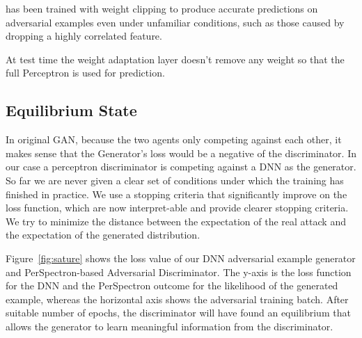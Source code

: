 \begin{note}
\scheme{} has been trained with weight clipping to produce accurate predictions on adversarial examples even under unfamiliar conditions, such as those caused by dropping a highly correlated feature.
\end{note}
 At test time the weight adaptation layer doesn't remove any weight so that the full Perceptron is used for prediction. 



\subsection{\scheme{} Equilibrium State }
In original GAN, because the two agents only competing against each other, it makes sense that the Generator's loss would be a negative of the discriminator. In our case a perceptron discriminator is competing against a DNN as the generator.  So far we are never given a clear set of conditions under which the training has finished in practice.
We use a stopping criteria that significantly improve on the loss function, which are now interpret-able and provide clearer stopping criteria. We try to minimize the distance between the expectation of the real attack and the expectation of the generated distribution.  


Figure~\ref{fig:sature} shows the loss value of our DNN adversarial example generator and PerSpectron-based Adversarial Discriminator. The y-axis is the loss function for the DNN and the PerSpectron outcome for the likelihood of the generated example, whereas the horizontal axis shows the adversarial training batch. After suitable number of epochs, the discriminator will have found an equilibrium that allows the generator to learn meaningful information from the discriminator. 


